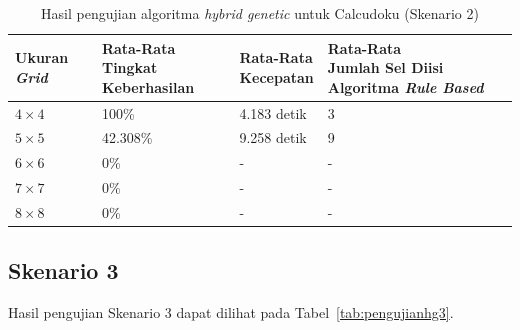 \begin{table}
\centering
\captionsetup{justification=centering}
\caption[Hasil pengujian algoritma \textit{hybrid genetic} untuk Calcudoku (Skenario 2)]{Hasil pengujian algoritma \textit{hybrid genetic} untuk Calcudoku (Skenario 2)}
\begin{tabular}{| l | l | l | l |}
\hline
Ukuran \textit{Grid} & \makecell[c]{Rata-Rata \\ Tingkat Keberhasilan} & \makecell[c]{Rata-Rata \\ Kecepatan} & \makecell[c]{Rata-Rata \\ Jumlah Sel Diisi Algoritma \textit{Rule Based}} \\
\hline \hline
\begin{math}4 \times 4\end{math} & 100\% & 4.183 detik & 3 \\
\hline
\begin{math}5 \times 5\end{math} & 42.308\% & 9.258 detik & 9 \\
\hline
\begin{math}6 \times 6\end{math} & 0\% & - & - \\
\hline
\begin{math}7 \times 7\end{math} & 0\% & - & - \\
\hline
\begin{math}8 \times 8\end{math} & 0\% & - & - \\
\hline
\end{tabular}
\label{tab:pengujianhg2}
\end{table}

\subsection{Skenario 3}
\label{sec:skenario3}

Hasil pengujian Skenario 3 dapat dilihat pada Tabel~\ref{tab:pengujianhg3}.

